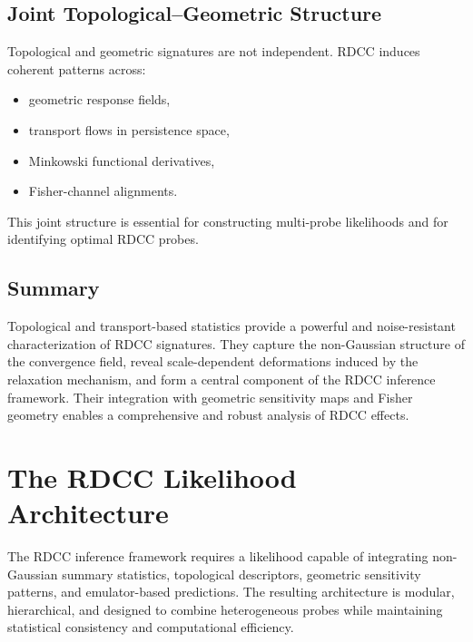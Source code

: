 \documentclass[11pt,a4paper]{article}
\begin{document}
\subsection{Joint Topological--Geometric Structure}

Topological and geometric signatures are not independent. RDCC induces coherent
patterns across:

\begin{itemize}
    \item geometric response fields,
    \item transport flows in persistence space,
    \item Minkowski functional derivatives,
    \item Fisher-channel alignments.
\end{itemize}

This joint structure is essential for constructing multi-probe likelihoods and
for identifying optimal RDCC probes.

\subsection{Summary}

Topological and transport-based statistics provide a powerful and noise-resistant
characterization of RDCC signatures. They capture the non-Gaussian structure of
the convergence field, reveal scale-dependent deformations induced by the
relaxation mechanism, and form a central component of the RDCC inference
framework. Their integration with geometric sensitivity maps and Fisher geometry
enables a comprehensive and robust analysis of RDCC effects.


\section{The RDCC Likelihood Architecture}

The RDCC inference framework requires a likelihood capable of integrating
non-Gaussian summary statistics, topological descriptors, geometric sensitivity
patterns, and emulator-based predictions. The resulting architecture is modular,
hierarchical, and designed to combine heterogeneous probes while maintaining
statistical consistency and computational efficiency.
\end{document}
